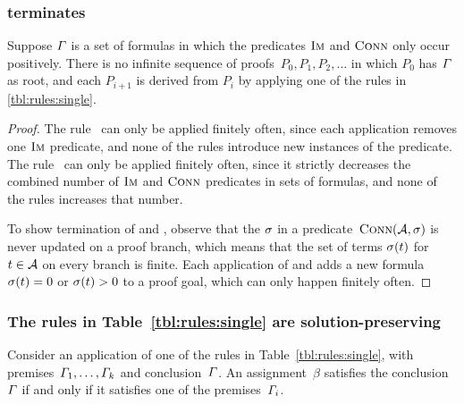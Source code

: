 \documentclass[acmsmall,review,anonymous,screen]{acmart}\settopmatter{printfolios=true,printccs=false,printacmref=true}
\theoremstyle{definition}
\begin{document}
\subsubsection{\Calculus{} terminates}
\begin{lemma}\label{lma:single-terminates}
  Suppose $\varGamma{}$ is a set of formulas in which the predicates
  $\operatorname{\textsc{Im}}$ and $\operatorname{\textsc{Conn}}$ only occur positively. There is no
  infinite sequence of proofs~$P_0, P_1, P_2, \ldots$ in which $P_0$
  has $\varGamma{}$ as root, and each $P_{i+1}$ is derived from
  $P_i$ by applying one of the rules in \cref{tbl:rules:single}.
\end{lemma}

\begin{proof}
  The rule~\Expand{} can only be applied finitely often, since each
  application removes one $\operatorname{\textsc{Im}}$ predicate, and none of the rules
  introduce new instances of the predicate. The rule~\Subsume{} can
  only be applied finitely often, since it strictly decreases the
  combined number of $\operatorname{\textsc{Im}}$ and $\operatorname{\textsc{Conn}}$ predicates in sets of
  formulas, and none of the rules increases that number.

  To show termination of \Split{} and \Propagate{}, observe that the
  $\operatorname{\sigma}$ in a predicate~$\operatorname{\textsc{Conn}}(\mathcal{A}, \operatorname{\sigma})$ is never
  updated on a proof branch, which means that the set of terms
  $\operatorname{\sigma}(t)$ for $t \in \mathcal{A}$ on every branch is finite. Each
  application of \Split{} and \Propagate{} adds a new
  formula~$\operatorname{\sigma}(t) = 0$ or $\operatorname{\sigma}(t) > 0$
  to a proof goal, which can only happen finitely often.
\end{proof}

\subsubsection{The rules in Table~\ref{tbl:rules:single} are solution-preserving}

\begin{lemma}\label{lma:single-correct}
  Consider an application of one of the rules in
  Table~\ref{tbl:rules:single}, with
  premises~$\varGamma_1, \ldots, \varGamma_k$ and
  conclusion~$\varGamma$. An assignment~$\beta$ satisfies the
  conclusion~$\varGamma$ if and only if it satisfies one of the
  premises~$\varGamma_i$.
\end{lemma}
\end{document}

